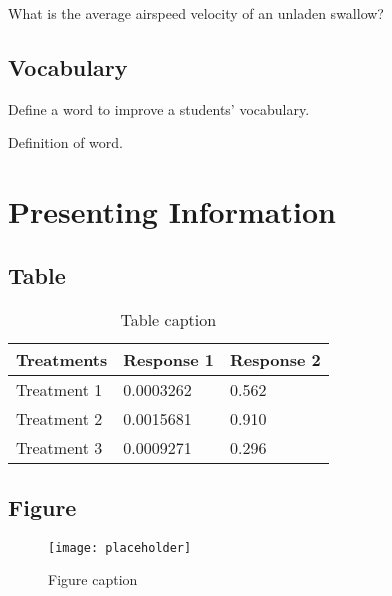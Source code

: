 \documentclass[11pt,fleqn]{book} %
\begin{document}
\begin{problem}
What is the average airspeed velocity of an unladen swallow?
\end{problem}


\section{Vocabulary}

Define a word to improve a students' vocabulary.

\begin{vocabulary}[Word]
Definition of word.
\end{vocabulary}



\chapter{Presenting Information}

\section{Table}

\begin{table}[h]
\centering
\begin{tabular}{l l l}
\toprule
\textbf{Treatments} & \textbf{Response 1} & \textbf{Response 2}\\
\midrule
Treatment 1 & 0.0003262 & 0.562 \\
Treatment 2 & 0.0015681 & 0.910 \\
Treatment 3 & 0.0009271 & 0.296 \\
\bottomrule
\end{tabular}
\caption{Table caption}
\end{table}


\section{Figure}

\begin{figure}[h]
\centering\texttt{[image: placeholder]}
\caption{Figure caption}
\end{figure}
\end{document}
